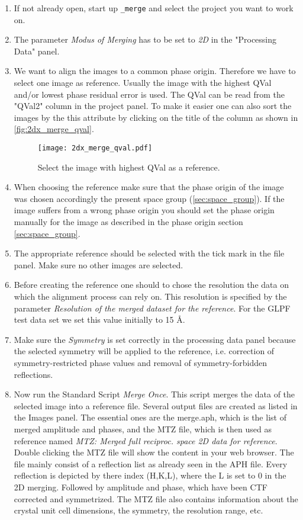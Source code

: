 \begin{enumerate}
	\item If not already open, start up {\twodx}\texttt{\_merge} and select the project you want to work on.
	\item The parameter \textit{Modus of Merging}  has to be set to \textit{2D} in the "Processing Data" panel.
	\item We want to align the images to a common phase origin. Therefore we have to select one image as reference. Usually the image with the highest QVal and/or lowest phase residual error is used. The QVal can be read from the "QVal2" column in the project panel. To make it easier one can also sort the images by the this attribute by clicking on the title of the column as shown in \autoref{fig:2dx_merge_qval}.
	
	\begin{figure}[H]
		\centering
		\texttt{[image: 2dx\_merge\_qval.pdf]}
		\caption{Select the image with highest QVal as a reference.}
		\label{fig:2dx_merge_qval}
	\end{figure}

	\item  When choosing the reference make sure that the phase origin of the image was chosen accordingly the present space group (\autoref{sec:space_group}). If the image suffers from a wrong phase origin you should set the phase origin manually for the image as described in the phase origin section \autoref{sec:space_group}.
	\item The appropriate reference should be selected with the tick mark in the file panel. Make sure no other images are selected.
	\item Before creating the reference one should to chose the resolution the data on which the alignment process can rely on. This resolution is specified by the parameter \textit{Resolution of the merged dataset for the reference}. For the GLPF test data set we set this value initially to 15 \AA.
	\item Make sure the \textit{Symmetry} is set correctly in the processing data panel because the selected symmetry will be applied to the reference, i.e. correction of symmetry-restricted phase values and removal of symmetry-forbidden reflections.
	\item Now run the Standard Script \textit{Merge Once}. This script merges the data of the selected image into a reference file. Several output files are created as listed in the Images panel. The essential ones are the merge.aph, which is the list of merged amplitude and phases, and the MTZ file, which is then used as reference named \textit{MTZ: Merged full reciproc. space 2D data for reference}. Double clicking the MTZ file will show the content in your web browser. The file mainly consist of a reflection list as already seen in the APH file. Every reflection is depicted by there index (H,K,L), where the L is set to 0 in the 2D merging. Followed by amplitude and phase, which have been CTF corrected and symmetrized. The MTZ file also contains information about the crystal unit cell dimensions, the symmetry, the resolution range, etc.
\end{enumerate}

